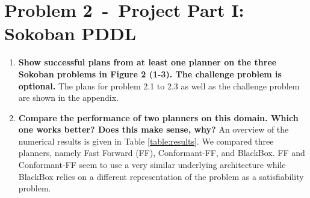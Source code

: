 \documentclass[12pt]{article}
\newcommand{\problem}[2]{\section*{Problem {#1}~-~{#2}}}
\begin{document}
\problem{2}{Project Part I: Sokoban PDDL}
\label{sec:problem_2}
\begin{enumerate}
 \item \textbf{Show successful plans from at least one planner on the three Sokoban problems in Figure 2
(1-3). The challenge problem is optional.}
  The plans for problem 2.1 to 2.3 as well as the challenge problem are shown in the appendix.
 \item \textbf{Compare the performance of two planners on this domain. Which one works better? Does this
make sense, why?} \newline
    An overview of the numerical results is given in Table \ref{table:results}. We compared three planners, namely Fast Forward (FF), Conformant-FF, and BlackBox. FF and Conformant-FF seem to use a very similar underlying architecture while BlackBox relies on a different representation of the problem as a satisfiability problem.
    

\end{enumerate}
\end{document}
